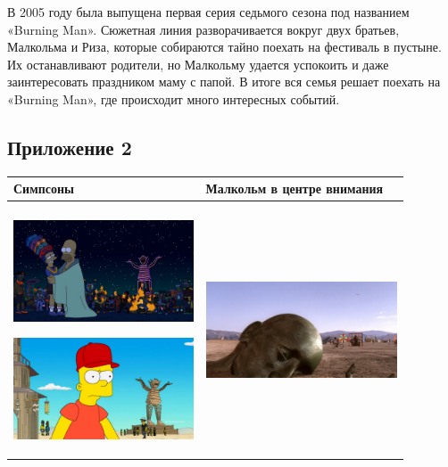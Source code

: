 \documentclass[10pt,a4paper]{report}
\begin{document}
В 2005 году была выпущена первая серия седьмого сезона под названием
«Burning Man». Сюжетная линия разворачивается вокруг двух братьев,
Малкольма и Риза, которые собираются тайно поехать на фестиваль в
пустыне. Их останавливают родители, но Малкольму удается успокоить и даже
заинтересовать праздником маму с папой. В итоге вся семья решает поехать
на «Burning Man», где происходит много интересных событий.

\subsection{Приложение 2}

\begin{table}[h!]
  \centering
  \begin{tabular}{  m{55mm} | m{55mm} }
  \centering
    \cellcolor[HTML]{f297ff}\textbf{Симпсоны} & \cellcolor[HTML]{b3fcff}\textbf{Малкольм в центре внимания}\\
    \hline
    \\
    \begin{minipage}{.3\textwidth}
      \includegraphics[height=30mm]{images/simpsons1.jpg}
    \end{minipage}
    \vspace{\baselineskip}
    \begin{minipage}{.3\textwidth}
      \includegraphics[height=30mm]{images/simpsons2.jpg}
    \end{minipage}
    &
    \begin{minipage}{.3\textwidth}
      \includegraphics[width = 56.7mm, height=30mm]{images/malcolm1.png}

\end{minipage}
\end{tabular}
\end{table}
\end{document}
